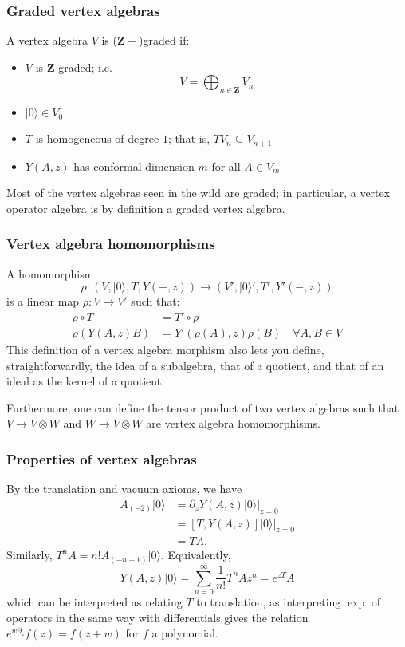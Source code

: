 \documentclass{article}
\newcommand{\ZZ}{\mathbold{Z}}
\newcommand{\vac}{|0\rangle}
\begin{document}
\subsubsection{Graded vertex algebras}
A vertex algebra $V$ is ($\ZZ-$)graded if:
\begin{itemize}
\item $V$ is $\ZZ$-graded; i.e.
  \[V = \bigoplus_{n \in \ZZ} V_n \]
\item $\vac \in V_0$
\item $T$ is homogeneous of degree $1$; that is, $TV_n \subseteq V_{n+1}$
\item $Y(A,z)$ has conformal dimension $m$ for all $A \in V_m$
\end{itemize}
Most of the vertex algebras seen in the wild are graded; in particular, a vertex operator algebra is by definition a graded vertex algebra.

\subsubsection{Vertex algebra homomorphisms}
A homomorphism
\[\rho: (V,\vac,T,Y(-,z)) \rightarrow (V',\vac',T',Y'(-,z)) \]
is a linear map $\rho: V \rightarrow V'$ such that:
\begin{align}
  \rho \circ T &= T'\circ \rho\\
  \rho(Y(A,z)B)&=Y'(\rho(A),z)\rho(B) \quad \forall A,B \in V
\end{align}
This definition of a vertex algebra morphism also lets you define, straightforwardly, the idea of a subalgebra, that of a quotient, and that of an ideal as the kernel of a quotient.

Furthermore, one can define the tensor product of two vertex algebras such that $V \rightarrow V \otimes W$ and $W \rightarrow V \otimes W$ are vertex algebra homomorphisms.

\subsubsection{Properties of vertex algebras}
By the translation and vacuum axioms, we have
\begin{align}
  A_{(-2)}\vac &= \partial_z Y(A,z) \vac |_{z=0}\\
  &=[T,Y(A,z)]\vac|_{z=0}\\
  &=TA.
\end{align}
Similarly, $T^nA=n!A_{(-n-1)}\vac$.  Equivalently,
\[Y(A,z) \vac = \sum_{n=0}^\infty \frac{1}{n!} T^nA z^n = e^{zT}A \]
which can be interpreted as relating $T$ to translation, as interpreting $\exp$ of operators in the same way with differentials gives the relation $e^{w \partial_z}f(z)=f(z+w)$ for $f$ a polynomial.
\end{document}
